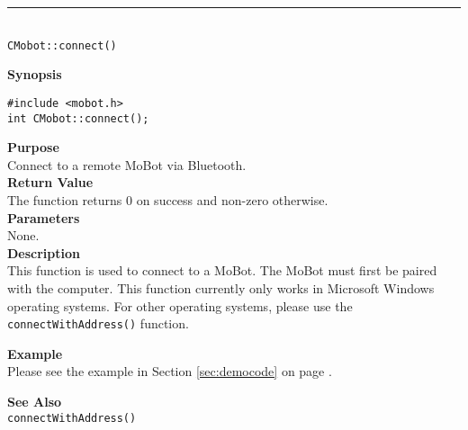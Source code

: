 \noindent
\vspace{5pt}
\rule{4.5in}{0.015in}\\
\noindent
{\LARGE \texttt{CMobot::connect()}}\\
{}

\noindent
{\bf Synopsis}\\
\begin{verbatim}
#include <mobot.h>
int CMobot::connect();
\end{verbatim}

\noindent
{\bf Purpose}\\
Connect to a remote MoBot via Bluetooth.\\

\noindent
{\bf Return Value}\\
The function returns 0 on success and non-zero otherwise.\\

\noindent
{\bf Parameters}\\
None.\\

\noindent
{\bf Description}\\
This function is used to connect to a MoBot. The MoBot must first be paired
with the computer. This function currently only works in Microsoft Windows
operating systems. For other operating systems, please use the
\texttt{connectWithAddress()} function.

\noindent
{\bf Example}\\
Please see the example in Section \ref{sec:democode} on page \pageref{sec:democode}.\\
\noindent

\noindent
{\bf See Also}\\
\texttt{connectWithAddress()}

